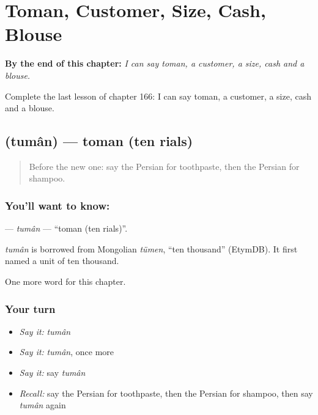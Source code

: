 
\chapter{Toman, Customer, Size, Cash, Blouse}
\label{ch:fa-toman-customer-size-cash-blouse}

\begin{chapteropening}
\textbf{By the end of this chapter:} \emph{I can say toman, a customer, a size, cash and a blouse.}

Complete the last lesson of chapter 166: I can say toman, a customer, a size, cash and a blouse.
\end{chapteropening}

\section[\texorpdfstring{\fa{تومان} (tumân)}{تومان (tumân)}]{ (tumân) — toman (ten rials)}

\label{lesson:FA-C166-tuman}



\begin{quote}
Before the new one: say the Persian for toothpaste, then the Persian for shampoo.
\end{quote}

\subsection*{You'll want to know: }
\textbf{} — \emph{tumân} — \textquotedblleft{}toman (ten rials)\textquotedblright{}.

\begin{cousinweb}
\emph{tumân} is borrowed from Mongolian \emph{tümen}, \textquotedblleft{}ten thousand\textquotedblright{} (EtymDB). It first named a unit of ten thousand.
\end{cousinweb}

\begin{grammarlens}[title={What you've built}]
One more word for this chapter.
\end{grammarlens}

\subsection*{Your turn}
\begin{itemize}
\raggedright
  \item \emph{Say it:} \emph{tumân}
  \item \emph{Say it:} \emph{tumân}, once more
  \item \emph{Say it:} say \emph{tumân}
  \item \emph{Recall:} say the Persian for toothpaste, then the Persian for shampoo, then say \emph{tumân} again
\end{itemize}

